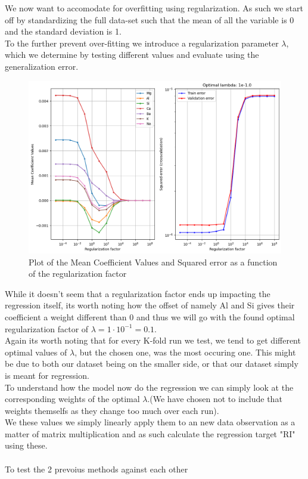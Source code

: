 We now want to accomodate for overfitting using regularization. As such we start off by standardizing the full data-set such that the mean of all the variable is 0 and the standard deviation is 1. \color[red]{It is worth noting that the helper function "rlr_validate" also standardizes its internal data partitions as a part of kfold cross-validation when it selects values of $\lambda$} \\
To the further prevent over-fitting we introduce a regularization parameter $\lambda$, which we determine by testing different values and evaluate using the generalization error.
\begin{figure}[H]
    \centering
    \includegraphics[width=15cm]{images/regularization.png}
    \caption{Plot of the Mean Coefficient Values and Squared error as a function of the regularization factor}
    \label{fig:regu_plot}
\end{figure}
While it doesn't seem that a regularization factor ends up impacting the regression itself, its worth noting how the offset of namely Al and Si gives their coefficient a weight different than 0 and thus we will go with the found optimal regularization factor of $\lambda = 1\cdot 10^{-1} = 0.1$. \\
Again its worth noting that for every K-fold run we test, we tend to get different optimal values of $\lambda$, but the chosen one, was the most occuring one. This might be due to both our dataset being on the smaller side, or that our dataset simply is meant for regression.\\

To understand how the model now do the regression we can simply look at the corresponding weights of the optimal $\lambda$.(We have chosen not to include that weights themselfs as they change too much over each run).\\We these values we simply linearly apply them to an new data observation as a matter of matrix multiplication and as such calculate the regression target "RI" using these.\\
\\
To test the 2 prevoius methods against each other 